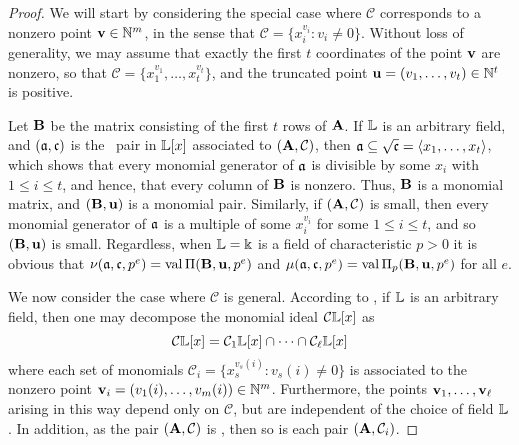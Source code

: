 \documentclass{article}
\begin{document}
\begin{proof}  
We will start by considering the special case where $\mathcal{C}$ corresponds to a nonzero point $\mathbf{v} \in \mathbb{N}^m$, in the sense that $\mathcal{C} = \{ x_i^{v_i} : v_i \neq 0 \}$. Without loss of generality, we may assume that exactly the first $t$ coordinates of the point $\mathbf{v}$ are nonzero, so that $\mathcal{C} = \{x_1^{v_1}, \ldots, x_t^{v_t}\}$, and the truncated point ${\mathbf{u}} = (v_1, \ldots, v_t) \in \mathbb{N}^t$ is positive.  

Let $\mathbf{B}$ be the matrix consisting of the first $t$ rows of $\mathbf{A}$.  If $\mathbb{L}$ is an arbitrary field, and $(\mathfrak{a}, \mathfrak{c})$ is the \compatible\ pair in $\mathbb{L}[x]$ associated to $(\mathbf{A}, \mathcal{C})$, then $\mathfrak{a} \subseteq \sqrt {\mathfrak{c}} = \langle x_1, \ldots, x_t \rangle$, which shows that every monomial generator of $\mathfrak{a}$ is divisible by some $x_i$ with $1 \leq i \leq t$, and hence, that every column of $\mathbf{B}$ is nonzero. Thus,  $\mathbf{B}$ is a monomial matrix, and $(\mathbf{B}, {\mathbf{u}})$ is a monomial pair.
Similarly, if $(\mathbf{A}, \mathcal{C})$ is small, then every monomial generator of $\mathfrak{a}$ is a multiple of some $x_i^{v_i}$ for some $1 \leq i \leq t$, and so $(\mathbf{B}, \mathbf{u})$ is small.  Regardless, when $\mathbb{L}=\Bbbk$ is a field of characteristic $p>0$ it is obvious that $\nu(\mathfrak{a}, \mathfrak{c}, p^e) = \operatorname{val} \Pi (\mathbf{B}, \mathbf{u}, p^e)$ and $\mu(\mathfrak{a}, \mathfrak{c}, p^e) = \operatorname{val} \Pi_p(\mathbf{B}, \mathbf{u}, p^e)$ for all $e$.

We now consider the case where $\mathcal{C}$ is general.   According to \cite[Lemma 5.18]{miller+sturmfels.combinatorial_CA},  if $\mathbb{L}$ is an arbitrary field, then one may decompose the monomial ideal $\mathcal{C} \mathbb{L}[x]$ as
%
\begin{equation}
\label{irreducible-decomposition: e}
 \mathcal{C} \mathbb{L}[x] = \mathcal{C}_1 \mathbb{L}[x] \cap \cdots \cap \mathcal{C}_{\ell} \mathbb{L}[x]
 \end{equation}
%
where each set of monomials $\mathcal{C}_i = \{ x_s^{v_s(i)} : v_s(i) \neq 0 \}$ is associated to the nonzero point $\mathbf{v}_i = (v_1(i), \ldots, v_m(i)) \in \mathbb{N}^m$. Furthermore, the points $\mathbf{v}_1, \ldots, \mathbf{v}_{\ell}$ arising in this way depend only on $\mathcal{C}$, but are independent of the choice of field $\mathbb{L}$.  In addition, as the pair $(\mathbf{A}, \mathcal{C})$ is \compatible, then so is each pair $(\mathbf{A}, \mathcal{C}_i)$.


\end{proof}
\end{document}
